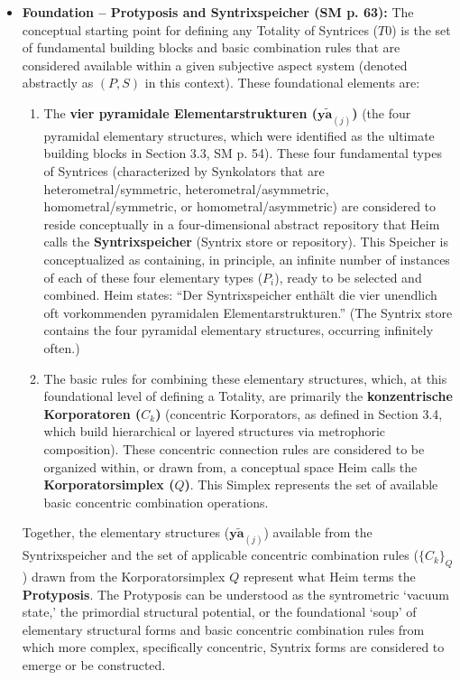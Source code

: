 \documentclass[12pt]{article}
\newcommand{\q}[1]{\enquote{#1}}
\newcommand{\aspektivsystem}{P}
\newcommand{\subjektiveraspekt}{S}
\newcommand{\elementarstruktur}{\bm{y\widetilde{a}}_{(j)}}
\newcommand{\syntrixtotalitaet}{T0}
\begin{document}
\begin{itemize}
    \item \textbf{Foundation – Protyposis and Syntrixspeicher (SM p. 63):}
    The conceptual starting point for defining any Totality of Syntrices (\(\syntrixtotalitaet\)) is the set of fundamental building blocks and basic combination rules that are considered available within a given subjective aspect system (denoted abstractly as \((\aspektivsystem,\subjektiveraspekt)\) in this context). These foundational elements are:
    \begin{enumerate}
        \item The \textbf{vier pyramidale Elementarstrukturen (\( \elementarstruktur \))} (the four pyramidal elementary structures, which were identified as the ultimate building blocks in Section 3.3, SM p. 54). These four fundamental types of Syntrices (characterized by Synkolators that are heterometral/symmetric, heterometral/asymmetric, homometral/symmetric, or homometral/asymmetric) are considered to reside conceptually in a four-dimensional abstract repository that Heim calls the \textbf{Syntrixspeicher} (Syntrix store or repository). This Speicher is conceptualized as containing, in principle, an infinite number of instances of each of these four elementary types (\(P_i\)), ready to be selected and combined. Heim states: \q{Der Syntrixspeicher enthält die vier unendlich oft vorkommenden pyramidalen Elementarstrukturen.} (The Syntrix store contains the four pyramidal elementary structures, occurring infinitely often.)
        \item The basic rules for combining these elementary structures, which, at this foundational level of defining a Totality, are primarily the \textbf{konzentrische Korporatoren (\( C_k \))} (concentric Korporators, as defined in Section 3.4, which build hierarchical or layered structures via metrophoric composition). These concentric connection rules are considered to be organized within, or drawn from, a conceptual space Heim calls the \textbf{Korporatorsimplex (\( Q \))}. This Simplex represents the set of available basic concentric combination operations.
    \end{enumerate}
    Together, the elementary structures (\( \elementarstruktur \)) available from the Syntrixspeicher and the set of applicable concentric combination rules (\( \{C_k\}_Q \)) drawn from the Korporatorsimplex \( Q \) represent what Heim terms the \textbf{Protyposis}. The Protyposis can be understood as the syntrometric ‘vacuum state,’ the primordial structural potential, or the foundational ‘soup’ of elementary structural forms and basic concentric combination rules from which more complex, specifically concentric, Syntrix forms are considered to emerge or be constructed.


\end{itemize}
\end{document}
